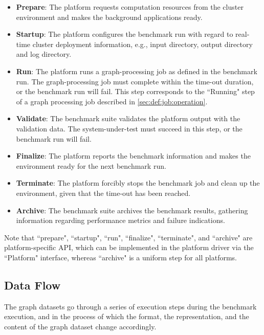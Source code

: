 \begin{itemize}
    \item \textbf{Prepare}: The platform requests computation resources from the cluster environment and makes the background applications ready.
    
    \item \textbf{Startup}: The platform configures the benchmark run with regard to real-time cluster deployment information, e.g., input directory, output directory and log directory.
    
    \item \textbf{Run}: The platform runs a graph-processing job as defined in the benchmark run. The graph-processing job must complete within the time-out duration, or the benchmark run will fail. This step corresponds to the ``Running" step of a graph processing job described in \ref{sec:def:job:operation}.
    
    \item \textbf{Validate}: The benchmark suite validates the platform output with the validation data. The system-under-test must succeed in this step, or the benchmark run will fail.
    
    \item \textbf{Finalize}: The platform reports the benchmark information and makes the environment ready for the next benchmark run.
    
    \item \textbf{Terminate}: The platform forcibly stops the benchmark job and clean up the environment, given that the time-out has been reached. 
    
    \item \textbf{Archive}: The benchmark suite archives the benchmark results, gathering information regarding performance metrics and failure indications.
\end{itemize}

Note that ``prepare", ``startup", ``run", ``finalize", ``terminate", and ``archive" are platform-specific API, which can be implemented in the platform driver via the ``Platform" interface, whereas ``archive" is a uniform step for all platforms. 


\subsection{Data Flow}
\label{sec:process:execution:data_flow}
The graph datasets go through a series of execution steps during the benchmark execution, and in the process of which the format, the representation, and the content of the graph dataset change accordingly.

